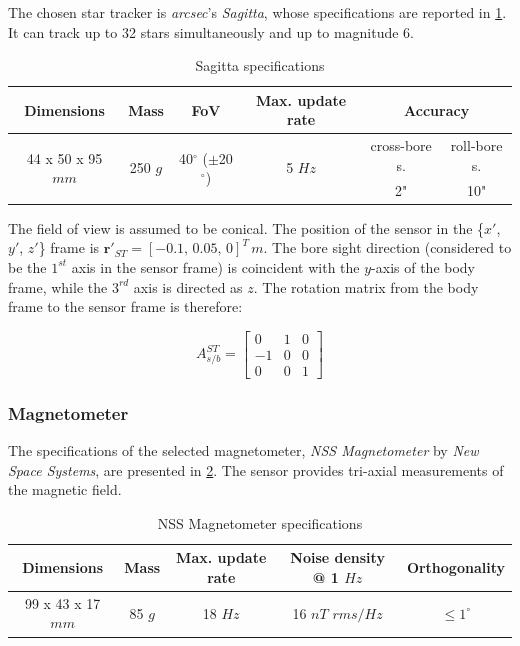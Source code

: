 The chosen star tracker is \textit{arcsec}'s \textit{Sagitta}, whose specifications are reported in \cref{tab:star_tracker}. It can track up to 32 stars simultaneously and up to magnitude 6.

\begin{table}[h]
    \centering
    \caption{Sagitta specifications \cite{star_tracker}}
    \begin{tabular}{cccccc}
    \toprule
    \toprule
    \textbf{Dimensions} & \textbf{Mass} & \textbf{FoV} & \textbf{Max. update rate} & \multicolumn{2}{c}{\textbf{Accuracy}} \\
    \midrule
    \multirow{2}{*}{44 x 50 x 95 $mm$} & \multirow{2}{*}{250 $g$} & \multirow{2}{*}{40$^{\circ}$ ($\pm$20$^{\circ}$)} & \multirow{2}{*}{5 $Hz$} & cross-bore s. & roll-bore s. \\
    \cmidrule{5-6}
    & & & & 2" & 10"  \\
    \bottomrule
    \bottomrule
    \end{tabular}
    \label{tab:star_tracker}
\end{table}

The field of view is assumed to be conical. The position of the sensor in the \{$x'$, $y'$, $z'$\} frame is $\mathbf{r}'_{ST} = [-0.1,\, 0.05,\, 0]^T \,m$. The bore sight direction (considered to be the $1^{st}$ axis in the sensor frame) is coincident with the $y$-axis of the body frame, while the $3^{rd}$ axis is directed as $z$. The rotation matrix from the body frame to the sensor frame is therefore:

$$ A_{s/b}^{ST} = \begin{bmatrix}
0 & 1 & 0 \\
-1 & 0 & 0 \\
0 & 0 & 1
\end{bmatrix} $$

\subsubsection{Magnetometer}

The specifications of the selected magnetometer, \textit{NSS Magnetometer} by \textit{New Space Systems}, are presented in \cref{tab:magnetometer}. The sensor provides tri-axial measurements of the magnetic field.

\begin{table}[h]
    \centering
    \caption {NSS Magnetometer specifications \cite{magnetometer}}
    \begin{tabular}{ccccc}
    \toprule
    \toprule
    \textbf{Dimensions} & \textbf{Mass} & \textbf{Max. update rate} & \textbf{Noise density @} 1 $Hz$ & \textbf{Orthogonality} \\
    \midrule
    99 x 43 x 17 $mm$ & 85 $g$ & 18 $Hz$ & 16 $nT$ $rms/Hz$ & $\leq 1^{\circ}$ \\
    \bottomrule
    \bottomrule
    \end{tabular}
    \label{tab:magnetometer}
\end{table}

